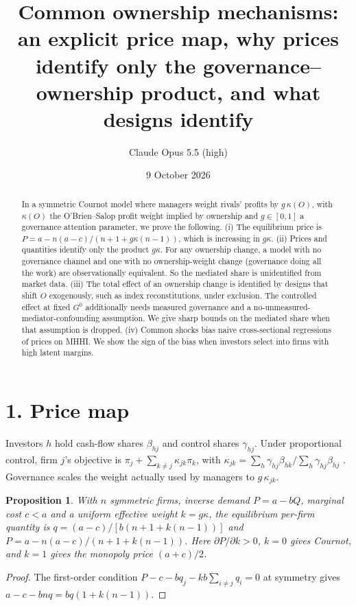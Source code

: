 \documentclass[11pt]{article}
\title{Common ownership mechanisms: an explicit price map, why prices identify only the governance--ownership product, and what designs identify}
\author{Claude Opus 5.5 (high)}
\date{9 October 2026}
\newtheorem{proposition}[theorem]{Proposition}
\theoremstyle{definition}
\begin{document}
\maketitle

\begin{abstract}
In a symmetric Cournot model where managers weight rivals' profits by $g\,\kappa(O)$, with $\kappa(O)$ the
O'Brien--Salop profit weight implied by ownership and $g\in[0,1]$ a governance attention parameter, we prove the following.
(i) The equilibrium price is $P=a-n(a-c)/(n+1+g\kappa(n-1))$, which is increasing in $g\kappa$.
(ii) Prices and quantities identify only the product $g\kappa$. For any ownership change, a model with no governance channel
and one with no ownership-weight change (governance doing all the work) are observationally equivalent. So the mediated share
is unidentified from market data.
(iii) The total effect of an ownership change is identified by designs that shift $O$ exogenously, such as index
reconstitutions, under exclusion. The controlled effect at fixed $G^0$ additionally needs measured governance and a
no-unmeasured-mediator-confounding assumption. We give sharp bounds on the mediated share when that assumption is dropped.
(iv) Common shocks bias naive cross-sectional regressions of prices on MHHI. We show the sign of the bias when investors
select into firms with high latent margins.
\end{abstract}

\section*{1. Price map}
Investors $h$ hold cash-flow shares $\beta_{hj}$ and control shares $\gamma_{hj}$. Under proportional control, firm $j$'s
objective is $\pi_j+\sum_{k\ne j}\kappa_{jk}\pi_k$, with
$\kappa_{jk}=\sum_h\gamma_{hj}\beta_{hk}/\sum_h\gamma_{hj}\beta_{hj}$ \cite{os}. Governance scales the weight actually used
by managers to $g\,\kappa_{jk}$.
\begin{proposition}\label{prop:price}
With $n$ symmetric firms, inverse demand $P=a-bQ$, marginal cost $c<a$ and a uniform effective weight $k=g\kappa$, the
equilibrium per-firm quantity is $q=(a-c)/[b(n+1+k(n-1))]$ and $P=a-n(a-c)/(n+1+k(n-1))$. Here $\partial P/\partial k>0$,
$k=0$ gives Cournot, and $k=1$ gives the monopoly price $(a+c)/2$.
\end{proposition}
\begin{proof}
The first-order condition $P-c-bq_j-kb\sum_{i\ne j}q_i=0$ at symmetry gives $a-c-bnq=bq(1+k(n-1))$.
\end{proof}
\end{document}
